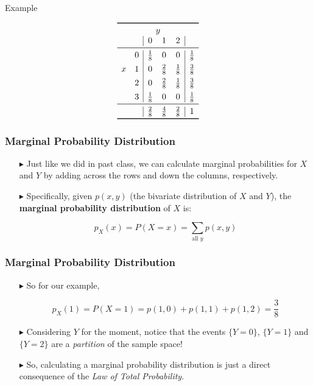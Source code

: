 \documentclass[12pt]{beamer}
\begin{document}
\begin{frame}{Example}

\[
\begin{array}{cc|ccc|c}
	\toprule
	\multicolumn{6}{c}{y}\\
	&& 0 & 1 & 2 & \\
	\midrule
	&0 & \frac{1}{8} & 0 & 0 & \frac{1}{8} \\[1ex]
	x&1 & 0 & \frac{2}{8} & \frac{1}{8} & \frac{3}{8} \\[1ex]
	&2 & 0 & \frac{2}{8} & \frac{1}{8} & \frac{3}{8} \\[1ex]
	&3 & \frac{1}{8} & 0 & 0 & \frac{1}{8} \\
	\midrule
	&& \frac{2}{8} & \frac{4}{8} & \frac{2}{8} & 1 \\
	\bottomrule
\end{array}
\]

\end{frame}

\begin{frame}
	\frametitle{Marginal Probability Distribution}
	
	\begin{itemize}
		\item[\color{blue}$\blacktriangleright$]Just like we did in past class, we can calculate marginal probabilities for $X$ and $Y$ by adding across the rows and down the columns, respectively.
		
		\item[\color{blue}$\blacktriangleright$]Specifically, given $p(x,y)$ (the bivariate distribution of $X$ and $Y$), the \textbf{marginal probability distribution} of $X$ is:
		
		\begin{equation*}
			p_X(x) = P(X = x) = \sum_{\text{all }y} p(x,y)
		\end{equation*}
		
	\end{itemize}
	
\end{frame}


\begin{frame}
	\frametitle{Marginal Probability Distribution}
	
	\begin{itemize}
		\item[\color{blue}$\blacktriangleright$]So for our example,
		
		\[
		p_X(1) = P(X = 1) = p(1,0) + p(1,1) + p(1,2) = \frac{3}{8}
		\]
		
		\item[\color{blue}$\blacktriangleright$]Considering $Y$ for the moment, notice that the events $\{Y = 0\}$, $\{Y = 1\}$ and $\{Y = 2\}$ are a \emph{partition} of the sample space!
		
		\item[\color{blue}$\blacktriangleright$]So, calculating a marginal probability distribution is just a direct consequence of the \emph{Law of Total Probability}.
		
	\end{itemize}
	
\end{frame}
\end{document}
